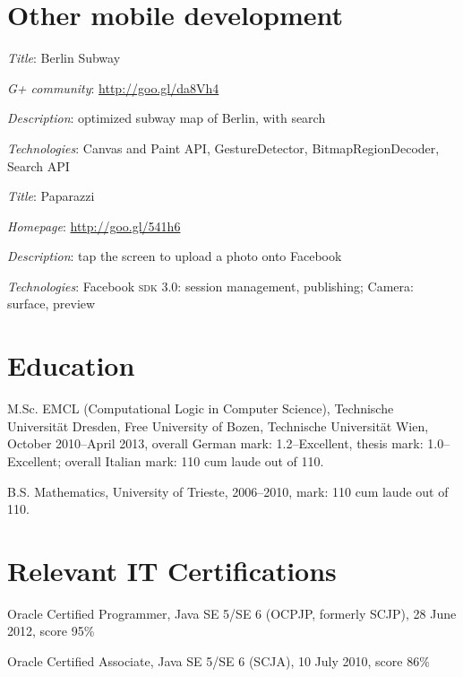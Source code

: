 \documentclass[letterpaper]{article}
\renewenvironment{itemize}{
  \begin{list}{}{
    \setlength{\leftmargin}{1.5em}
  }
}{
  \end{list}
}
\newenvironment{itemize1}{
  \begin{list}{}{
    \setlength{\leftmargin}{0em}
  }
}{
  \end{list}
}
\begin{document}
\section*{Other mobile development}

\begin{itemize1}
	\item
	\begin{itemize} 
	    \item {\it Title}: Berlin Subway
	    \item {\it G+ community}: \url{http://goo.gl/da8Vh4}
	    \item {\it Description}: optimized subway map of Berlin, with search
	    \item {\it Technologies}: Canvas and Paint API, GestureDetector, BitmapRegionDecoder, Search API
	\end{itemize}\medskip
    \item
	\begin{itemize}
	      \item {\it Title}: Paparazzi
	      \item {\it Homepage}: \url{http://goo.gl/541h6}
	      \item {\it Description}: tap the screen to upload a photo onto Facebook
	      \item {\it Technologies}: Facebook \textsc{sdk} 3.0: session management, publishing; Camera: surface, preview       
	\end{itemize}           
\end{itemize1}


\section*{Education}
\begin{itemize}
  \item M.Sc. EMCL (Computational Logic in Computer Science), Technische Universit\"{a}t Dresden, Free University of Bozen, Technische Universit\"{a}t Wien, October 2010--April 2013, overall German mark: 1.2--Excellent, thesis mark: 1.0--Excellent; overall Italian mark: 110 cum laude out of 110.

  \item B.S. Mathematics, University of Trieste, 2006--2010, mark: 110 cum laude out of 110. 
\end{itemize}

\section*{Relevant IT Certifications}
\begin{itemize}
\item Oracle Certified Programmer, Java SE 5/SE 6 (OCPJP, formerly SCJP), 28 June 2012, score 95\%
\item Oracle Certified Associate, Java SE 5/SE 6 (SCJA), 10 July 2010, score 86\%
\end{itemize}
\end{document}
